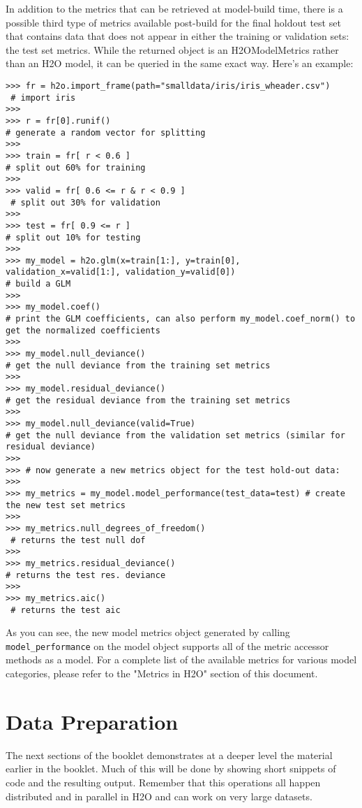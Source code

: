 In addition to the metrics that can be retrieved at model-build time, there is a possible third type of metrics available post-build for the final holdout test set that contains data that does not appear in either the training or validation sets: the test set metrics. While the returned object is an H2OModelMetrics rather than an H2O model, it can be queried in the same exact way. Here's an example:
\begin{lstlisting}[style=python]
>>> fr = h2o.import_frame(path="smalldata/iris/iris_wheader.csv")  
 # import iris
>>>
>>> r = fr[0].runif()                       
# generate a random vector for splitting
>>>
>>> train = fr[ r < 0.6 ]                   
# split out 60% for training
>>>
>>> valid = fr[ 0.6 <= r & r < 0.9 ]       
 # split out 30% for validation
>>>
>>> test = fr[ 0.9 <= r ]                   
# split out 10% for testing
>>>
>>> my_model = h2o.glm(x=train[1:], y=train[0], validation_x=valid[1:], validation_y=valid[0])  
# build a GLM
>>>
>>> my_model.coef()                         
# print the GLM coefficients, can also perform my_model.coef_norm() to get the normalized coefficients
>>>
>>> my_model.null_deviance()                
# get the null deviance from the training set metrics
>>>
>>> my_model.residual_deviance()            
# get the residual deviance from the training set metrics
>>>
>>> my_model.null_deviance(valid=True)      
# get the null deviance from the validation set metrics (similar for residual deviance)
>>>
>>> # now generate a new metrics object for the test hold-out data:
>>>
>>> my_metrics = my_model.model_performance(test_data=test) # create the new test set metrics
>>>
>>> my_metrics.null_degrees_of_freedom()   
 # returns the test null dof
>>>
>>> my_metrics.residual_deviance()          
# returns the test res. deviance
>>>
>>> my_metrics.aic()                       
 # returns the test aic
\end{lstlisting}

As you can see, the new model metrics object generated by calling \texttt{model\_performance} on the model object supports all of the metric accessor methods as a model. For a complete list of the available metrics for various model categories, please refer to the "Metrics in H2O" section of this document.

\section{Data Preparation}
The next sections of the booklet demonstrates at a deeper level the material earlier
in the booklet.  Much of this will be done by showing short snippets of code and the
resulting output.  Remember that this operations all happen distributed and in
parallel in H2O and can work on very large datasets.

